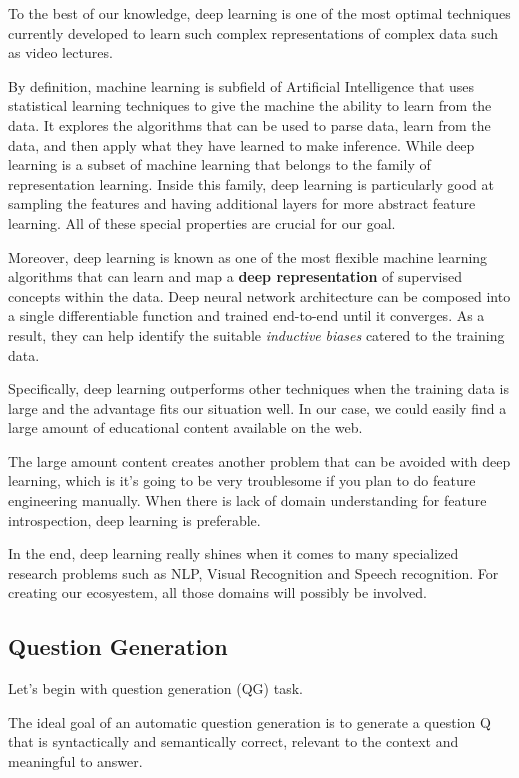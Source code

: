 \documentclass{acm_proc_article-sp}
\begin{document}
To the best of our knowledge, deep learning is one of the most optimal
techniques currently developed to learn such complex representations of
complex data such as video lectures.

By definition, machine learning is subfield of Artificial Intelligence
that uses statistical learning techniques to give the machine the
ability to learn from the data. It explores the algorithms that can be
used to parse data, learn from the data, and then apply what they have
learned to make inference. While deep learning is a subset of machine
learning that belongs to the family of representation learning. Inside
this family, deep learning is particularly good at sampling the features
and having additional layers for more abstract feature learning. All of
these special properties are crucial for our goal.

Moreover, deep learning is known as one of the most flexible machine
learning algorithms that can learn and map a \textbf{deep
representation} of supervised concepts within the data. Deep neural
network architecture can be composed into a single differentiable
function and trained end-to-end until it converges. As a result, they
can help identify the suitable \emph{inductive} \emph{biases} catered to
the training data.

Specifically, deep learning outperforms other techniques when the
training data is large and the advantage fits our situation well. In our
case, we could easily find a large amount of educational content
available on the web.

The large amount content creates another problem that can be avoided
with deep learning, which is it's going to be very troublesome if you
plan to do feature engineering manually. When there is lack of domain
understanding for feature introspection, deep learning is preferable.

In the end, deep learning really shines when it comes to many
specialized research problems such as NLP, Visual Recognition and Speech
recognition. For creating our ecosyestem, all those domains will
possibly be involved.

\subsection{Question Generation}\label{question-generation}

Let's begin with question generation (QG) task.

The ideal goal of an automatic question generation is to generate a
question Q that is syntactically and semantically correct, relevant to
the context and meaningful to answer.
\end{document}
